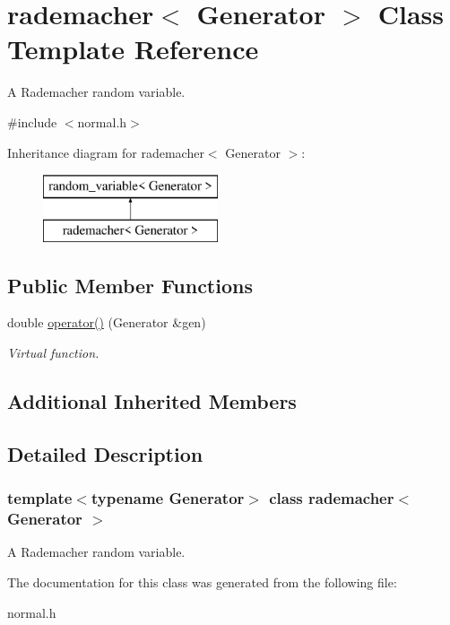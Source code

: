 \hypertarget{classrademacher}{}\section{rademacher$<$ Generator $>$ Class Template Reference}
\label{classrademacher}


A Rademacher random variable.  




{\ttfamily \#include $<$normal.\+h$>$}

Inheritance diagram for rademacher$<$ Generator $>$\+:\begin{figure}[H]
\begin{center}
\leavevmode
\includegraphics[height=2.000000cm]{classrademacher}
\end{center}
\end{figure}
\subsection*{Public Member Functions}
\begin{DoxyCompactItemize}
\item 
\mbox{\label{classrademacher_ad497f5af40bc0d18d33d04c9e13976c1}} 
double \mbox{\hyperlink{classrademacher_ad497f5af40bc0d18d33d04c9e13976c1}{operator()}} (Generator \&gen)
\begin{DoxyCompactList}\small\item\em Virtual function. \end{DoxyCompactList}\end{DoxyCompactItemize}
\subsection*{Additional Inherited Members}


\subsection{Detailed Description}
\subsubsection*{template$<$typename Generator$>$\newline
class rademacher$<$ Generator $>$}

A Rademacher random variable. 

The documentation for this class was generated from the following file\+:\begin{DoxyCompactItemize}
\item 
normal.\+h\end{DoxyCompactItemize}
